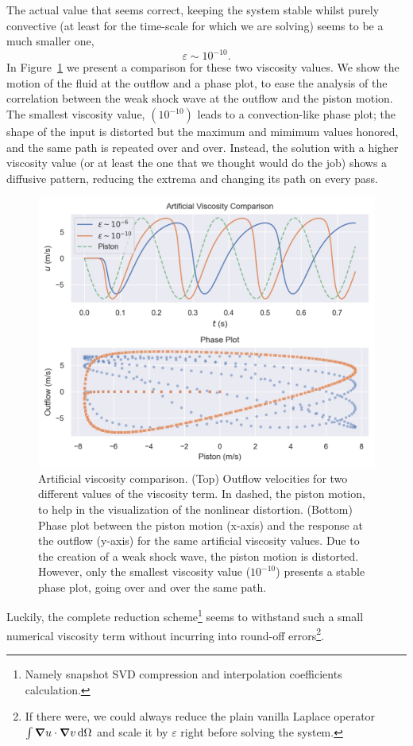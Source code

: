 \documentclass[../../thesis.tex]{subfiles}
\begin{document}
The actual value that seems correct, keeping the system stable whilst purely convective (at least for the time-scale for which we are solving) seems to be a much smaller one,
\begin{equation}
    \varepsilon \sim 10^{-10}.
\end{equation}
In Figure~\ref{fig:artificial_viscosity_comparison} we present a comparison for these two viscosity values.
We show the motion of the fluid at the outflow and a phase plot, to ease the analysis of the correlation between the weak shock wave at the outflow and the piston motion.
The smallest viscosity value, $(10^{-10})$ leads to a convection-like phase plot; 
the shape of the input is distorted but the maximum and mimimum values honored, and the same path is repeated over and over.
Instead, the solution with a higher viscosity value (or at least the one that we thought would do the job) shows a diffusive pattern, reducing the extrema and changing its path on every pass.
\begin{figure}[!h]
    \centering
    \includegraphics[width=1.0\columnwidth]{research_project/piston/figures/artificial_viscosity/artificial_viscosity_comparison.png}
    \caption{Artificial viscosity comparison.
    (Top) Outflow velocities for two different values of the viscosity term.
    In dashed, the piston motion, to help in the visualization of the nonlinear distortion.
    (Bottom) Phase plot between the piston motion (x-axis) and the response at the outflow (y-axis) for the same artificial viscosity values.
    Due to the creation of a weak shock wave, the piston motion is distorted.
    However, only the smallest viscosity value ($10^{-10}$) presents a stable phase plot, going over and over the same path. 
    }
    \label{fig:artificial_viscosity_comparison}
\end{figure}
Luckily, the complete reduction scheme\footnote{
    Namely snapshot SVD compression and interpolation coefficients calculation.
}
seems to withstand such a small numerical viscosity term without incurring into round-off errors\footnote{If there were, we could always reduce the plain vanilla Laplace operator $\int \grad u \cdot \grad v \, \text{d}\Omega$ and scale it by $\varepsilon$ right before solving the system.}.
\end{document}
